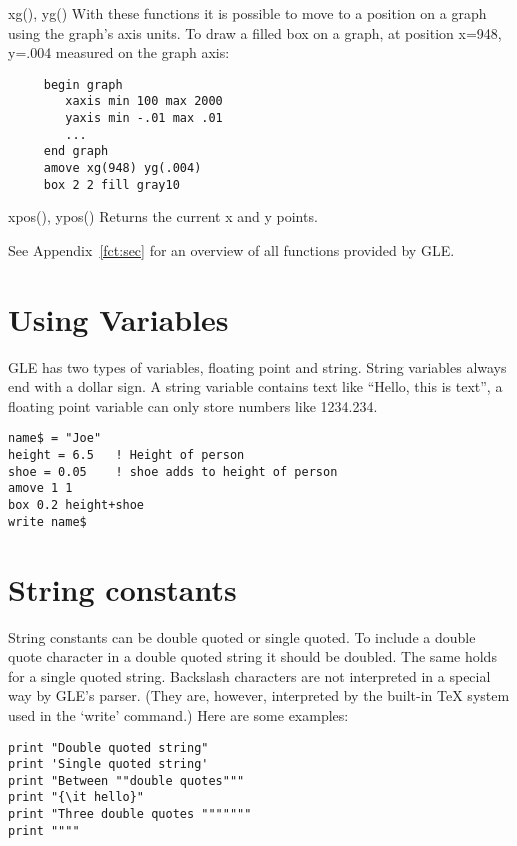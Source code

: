 \begin{commanddescription}
\item[{\sf xg(), yg()}]
 
With these functions it is possible to move to a position on a graph
using the graph's axis units.
To draw a filled box on a graph, at position x=948, y=.004  measured
on the graph axis:

\preglecode{}
\begin{Verbatim}
     begin graph
        xaxis min 100 max 2000
        yaxis min -.01 max .01
        ...
     end graph
     amove xg(948) yg(.004)
     box 2 2 fill gray10
\end{Verbatim}
\postglecode{}

\item[{\sf xpos(), ypos()}]
 
Returns the current x and y points.
\end{commanddescription}

\noindent{}See Appendix~\ref{fct:sec} for an overview of all functions provided by GLE.

\section{Using Variables}

GLE has two types of variables,  floating point and string. String 
variables always end with a dollar sign.  A string variable contains
text like ``Hello, this is text'', a floating point variable can
only store numbers like 1234.234.

\preglecode{}
\begin{Verbatim}
name$ = "Joe"
height = 6.5   ! Height of person
shoe = 0.05    ! shoe adds to height of person
amove 1 1
box 0.2 height+shoe
write name$
\end{Verbatim}
\postglecode{}

\section{String constants}

String constants can be double quoted or single quoted. To include a double quote character in a double quoted string it should be doubled. The same holds for a single quoted string. Backslash characters are not interpreted in a special way by GLE's parser. (They are, however, interpreted by the built-in \TeX{} system used in the `{\sf write}' command.) Here are some examples:

\preglecode{}
\begin{Verbatim}
print "Double quoted string"
print 'Single quoted string'
print "Between ""double quotes"""
print "{\it hello}"
print "Three double quotes """""""
print """"
\end{Verbatim}
\postglecode{}

